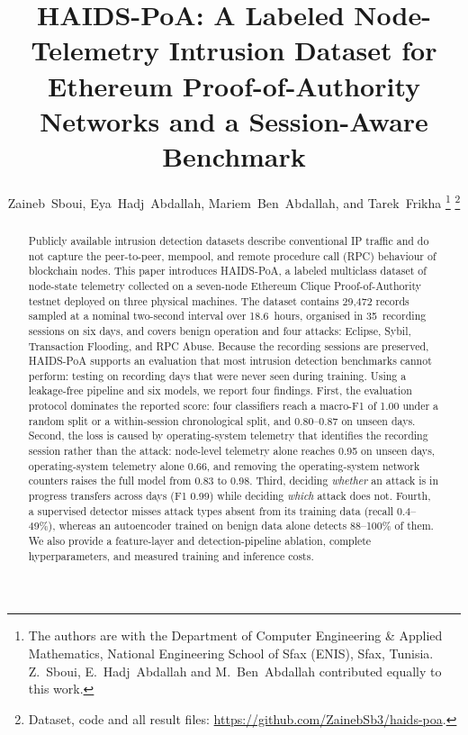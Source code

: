 \documentclass[journal]{IEEEtran}
\begin{document}
\title{HAIDS-PoA: A Labeled Node-Telemetry Intrusion Dataset for Ethereum Proof-of-Authority Networks and a Session-Aware Benchmark}

\author{Zaineb~Sboui, Eya~Hadj~Abdallah, Mariem~Ben~Abdallah, and Tarek~Frikha%
\thanks{The authors are with the Department of Computer Engineering \& Applied Mathematics, National Engineering School of Sfax (ENIS), Sfax, Tunisia. Z.~Sboui, E.~Hadj~Abdallah and M.~Ben~Abdallah contributed equally to this work.}%
\thanks{Dataset, code and all result files: \url{https://github.com/ZainebSb3/haids-poa}.}}

\maketitle

\begin{abstract}
Publicly available intrusion detection datasets describe conventional IP traffic and do not capture the peer-to-peer, mempool, and remote procedure call (RPC) behaviour of blockchain nodes. This paper introduces HAIDS-PoA, a labeled multiclass dataset of node-state telemetry collected on a seven-node Ethereum Clique Proof-of-Authority testnet deployed on three physical machines. The dataset contains 29{,}472 records sampled at a nominal two-second interval over 18.6~hours, organised in 35~recording sessions on six days, and covers benign operation and four attacks: Eclipse, Sybil, Transaction Flooding, and RPC Abuse. Because the recording sessions are preserved, HAIDS-PoA supports an evaluation that most intrusion detection benchmarks cannot perform: testing on recording days that were never seen during training. Using a leakage-free pipeline and six models, we report four findings. First, the evaluation protocol dominates the reported score: four classifiers reach a macro-F1 of 1.00 under a random split or a within-session chronological split, and 0.80--0.87 on unseen days. Second, the loss is caused by operating-system telemetry that identifies the recording session rather than the attack: node-level telemetry alone reaches 0.95 on unseen days, operating-system telemetry alone 0.66, and removing the operating-system network counters raises the full model from 0.83 to 0.98. Third, deciding \emph{whether} an attack is in progress transfers across days (F1 0.99) while deciding \emph{which} attack does not. Fourth, a supervised detector misses attack types absent from its training data (recall 0.4--49\%), whereas an autoencoder trained on benign data alone detects 88--100\% of them. We also provide a feature-layer and detection-pipeline ablation, complete hyperparameters, and measured training and inference costs.
\end{abstract}
\end{document}
